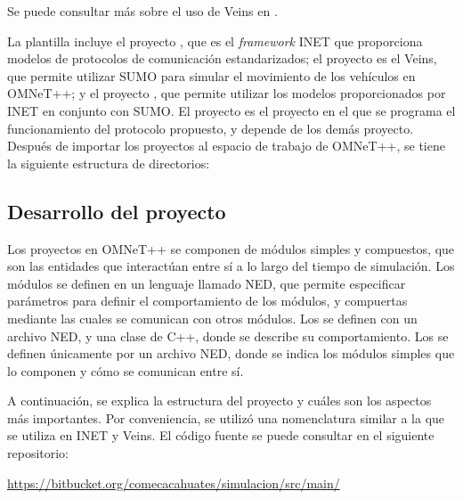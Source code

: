 Se puede consultar más sobre el uso de Veins en \cite{TutorialVeins}.

La plantilla incluye el proyecto , que es el \textit{framework} INET
que proporciona modelos de protocolos de comunicación estandarizados; el
proyecto  es el  Veins, que permite utilizar SUMO
para simular el movimiento de los vehículos en OMNeT++; y el proyecto
, que permite utilizar los modelos proporcionados por INET en
conjunto con SUMO. El proyecto  es el proyecto en el que se
programa el funcionamiento del protocolo propuesto, y depende de los demás
proyecto. Después de importar los proyectos al espacio de trabajo de OMNeT++,
se tiene la siguiente estructura de directorios:



\subsection{Desarrollo del proyecto}

\label{subsec:desarrollo_proyecto}

Los proyectos en OMNeT++ se componen de módulos simples y compuestos, que son
las entidades que interactúan entre sí a lo largo del tiempo de simulación. Los
módulos se definen en un lenguaje llamado NED, que permite especificar
parámetros para definir el comportamiento de los módulos, y compuertas mediante
las cuales se comunican con otros módulos. Los  se
definen con un archivo NED, y una clase de C++, donde se describe su
comportamiento. Los  se definen únicamente por un
archivo NED, donde se indica los módulos simples que lo componen y cómo se
comunican entre sí.

A continuación, se explica la estructura del proyecto y cuáles son los aspectos
más importantes. Por conveniencia, se utilizó una nomenclatura similar a la que
se utiliza en INET y Veins. El código fuente se puede consultar en el siguiente
repositorio:

\begin{center}
\href{https://bitbucket.org/comecacahuates/simulacion/src/main/}
{https://bitbucket.org/comecacahuates/simulacion/src/main/}
\end{center}

